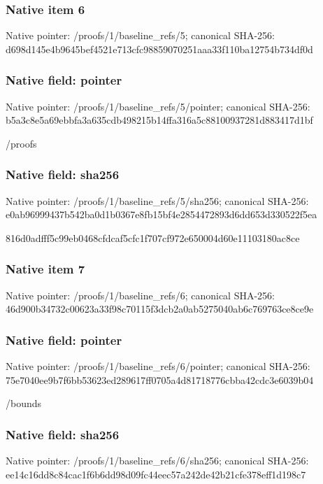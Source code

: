 \documentclass[10pt,a4paper]{article}
\begin{document}
\subsubsection{Native item 6}
Native pointer: /proofs/1/baseline\_\allowbreak{}refs/5; canonical SHA-256: d698d145e4b9645bef4521e713cfc98859070251aaa33f110ba12754b734df0d

\subsubsection{Native field: pointer}
Native pointer: /proofs/1/baseline\_\allowbreak{}refs/5/pointer; canonical SHA-256: b5a3c8e5a69ebbfa3a635cdb498215b14ffa316a5c88100937281d883417d1bf

\begingroup\raggedright\sloppy /\allowbreak{}proofs\par\endgroup

\subsubsection{Native field: sha256}
Native pointer: /proofs/1/baseline\_\allowbreak{}refs/5/sha256; canonical SHA-256: e0ab96999437b542ba0d1b0367e8fb15bf4e2854472893d6dd653d330522f5ea

\begingroup\raggedright\sloppy 816d0adfff5c99eb0468cfdcaf5cfc1f707cf972e650004d60e11103180ac8ce\par\endgroup

\subsubsection{Native item 7}
Native pointer: /proofs/1/baseline\_\allowbreak{}refs/6; canonical SHA-256: 46d900b34732c00623a33f98c70115f3dcb2a0ab5275040ab6c769763ce8ce9e

\subsubsection{Native field: pointer}
Native pointer: /proofs/1/baseline\_\allowbreak{}refs/6/pointer; canonical SHA-256: 75e7040ee9b7f6bb53623ed289617ff0705a4d81718776cbba42cdc3e6039b04

\begingroup\raggedright\sloppy /\allowbreak{}bounds\par\endgroup

\subsubsection{Native field: sha256}
Native pointer: /proofs/1/baseline\_\allowbreak{}refs/6/sha256; canonical SHA-256: ee14c16dd8c84cac1f6b6dd98d09fc44eec57a242de42b21cfe378eff1d198c7
\end{document}
